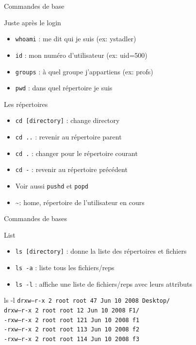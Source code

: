 \begin{frame}{Commandes de base}
\begin{block}{Juste après le login}
\begin{itemize}
\item \texttt{whoami} : me dit qui je suis (ex: ystadler)
\item \texttt{id} : mon numéro d'utilisateur (ex: uid=500)
\item \texttt{groups} : à quel groupe j'appartiens (ex: profs)
\item \texttt{pwd} : dans quel répertoire je suis
\end{itemize}
\end{block}

\begin{block}{Les répertoires}
\begin{itemize}
\item \texttt{cd [directory]} : change directory
\item \texttt{cd ..} : revenir au répertoire parent
\item \texttt{cd .} : changer pour le répertoire courant
\item \texttt{cd -} : revenir au répertoire précédent
\item Voir aussi \texttt{pushd} et \texttt{popd}
\item \textasciitilde : home, répertoire de l'utilisateur en cours
\end{itemize}

\end{block}
\end{frame}


\begin{frame}{Commandes de bases}
\begin{block}{List}
\begin{itemize}
\item \texttt{ls [directory]} : donne la liste des répertoires et fichiers
\item \texttt{ls -a} : liste tous les fichiers/reps
\item \texttt{ls -l} : affiche une liste de fichiers/reps avec leurs attributs
\end{itemize}
\end{block}

\begin{block}{ls -l}
\texttt{drxw---r-x 2 root root 47  Jun 10 2008 Desktop/ \\
drxw---r-x 2 root root 12  Jun 10 2008 F1/ \\
-rxw---r-x 2 root root 121 Jun 10 2008 f1 \\
-rxw---r-x 2 root root 113 Jun 10 2008 f2 \\
-rxw---r-x 2 root root 114 Jun 10 2008 f3
}
\end{block}
\end{frame}


